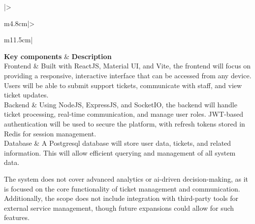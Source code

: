 	\begin{longtable}{{|>{\raggedright\arraybackslash}m{4.8cm}|>{\raggedright\arraybackslash}m{11.5cm}|}} 
		\hline
		\textbf{Key components} & \textbf{Description}\\ \hline
		Frontend & Built with ReactJS, Material UI, and Vite, the frontend will focus on providing a responsive, interactive interface that can be accessed from any device. Users will be able to submit support tickets, communicate with staff, and view ticket updates.
		\\ \hline
		Backend & Using NodeJS, ExpressJS, and SocketIO, the backend will handle ticket processing, real-time communication, and manage user roles. JWT-based authentication will be used to secure the platform, with refresh tokens stored in Redis for session management.
		\\ \hline
		Database & A Postgre\acs{sql} database will store user data, tickets, and related information. This will allow efficient querying and management of all system data.
		\\ \hline
		
		
		\caption{System key components} %
		\label{tab:sys-key-components}
	\end{longtable}
\noindent The system does not cover advanced analytics or \acs{ai}-driven decision-making, as it is focused on the core functionality of ticket management and communication. Additionally, the scope does not include integration with third-party tools for external service management, though future expansions could allow for such features.

\newpage

